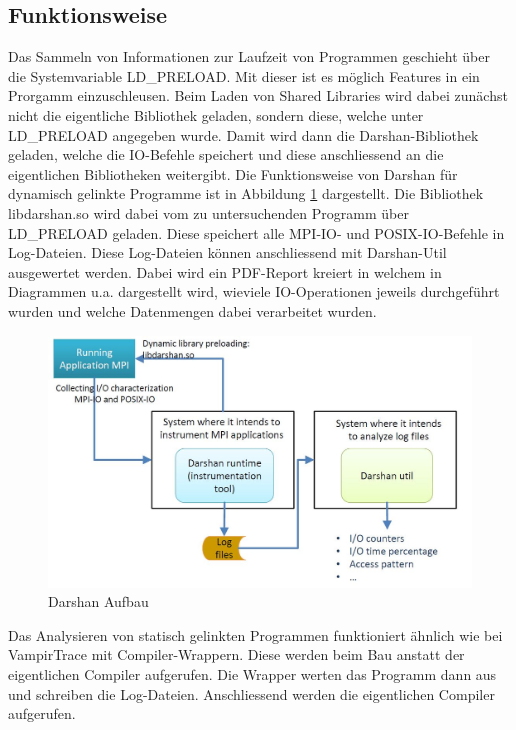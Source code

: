 \subsection{Funktionsweise}
Das Sammeln von Informationen zur Laufzeit von Programmen geschieht \"uber die Systemvariable LD\_PRELOAD. Mit dieser ist es m\"oglich Features in ein Prorgamm einzuschleusen. Beim Laden von Shared Libraries wird dabei zun\"achst nicht die eigentliche Bibliothek geladen, sondern diese, welche unter LD\_PRELOAD angegeben wurde. Damit wird dann die Darshan-Bibliothek geladen, welche die IO-Befehle speichert und diese anschliessend an die eigentlichen Bibliotheken weitergibt. Die Funktionsweise von Darshan f\"ur dynamisch gelinkte Programme ist in Abbildung \ref{fig:darshan} dargestellt. Die Bibliothek libdarshan.so wird dabei vom zu untersuchenden Programm \"uber LD\_PRELOAD geladen. Diese speichert alle MPI-IO- und POSIX-IO-Befehle in Log-Dateien. Diese Log-Dateien k\"onnen anschliessend mit Darshan-Util ausgewertet werden. Dabei wird ein PDF-Report kreiert in welchem in Diagrammen u.a. dargestellt wird, wieviele IO-Operationen jeweils durchgef\"uhrt wurden und welche Datenmengen dabei verarbeitet wurden.

\begin{figure}[h]
	\centering
	\includegraphics[width=12cm]{fig/Darshan.jpg}
	\caption{Darshan Aufbau \cite{Mendez.23.06.2016}}
	\label{fig:darshan}
\end{figure}

Das Analysieren von statisch gelinkten Programmen funktioniert \"ahnlich wie bei VampirTrace mit Compiler-Wrappern. Diese werden beim Bau anstatt der eigentlichen Compiler aufgerufen. Die Wrapper werten das Programm dann aus und schreiben die Log-Dateien. Anschliessend werden die eigentlichen Compiler aufgerufen. \cite{ArgonneNationalLaboratory.22.01.2019}\cite{ArgonneNationalLaboratory.19.01.2019}
